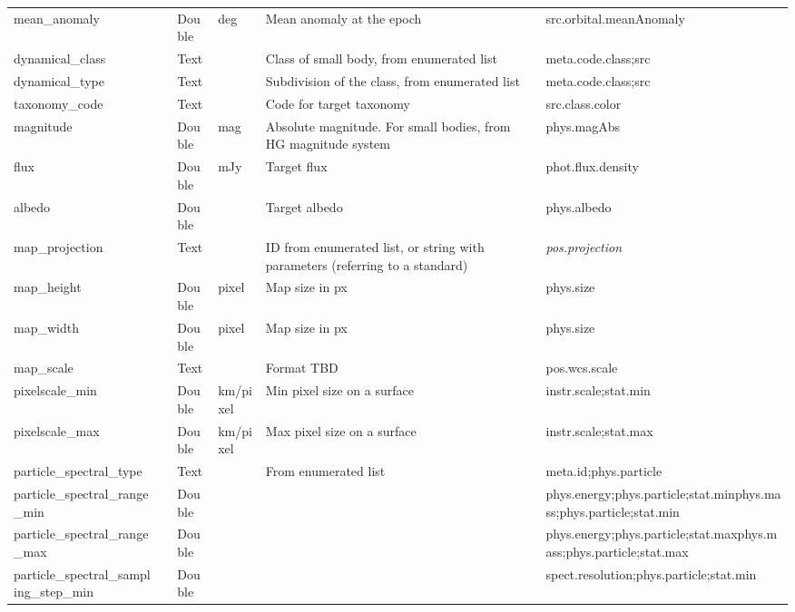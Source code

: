\documentclass[11pt,a4paper]{ivoa}
\begin{document}
\begin{longtable}{p{3.5cm}p{0.5cm}p{1cm}p{1cm}p{7cm}p{3cm}}
mean\_anomaly&&Double&deg&Mean anomaly at the epoch&src.orbital.meanAnomaly\\

dynamical\_class&&Text&&Class of small body, from enumerated list&meta.code.class;src\\

dynamical\_type&&Text&&Subdivision of the class, from enumerated list&meta.code.class;src\\

taxonomy\_code&&Text&&Code for target taxonomy&src.class.color\\

magnitude&&Double&mag&Absolute magnitude. For small bodies, from HG magnitude system&phys.magAbs\\

flux&&Double&mJy&Target flux&phot.flux.density\\

albedo&&Double&&Target albedo&phys.albedo\\

map\_projection&&Text&&ID from enumerated list, or string with parameters (referring to a standard)&\emph{pos.projection}\\

map\_height&&Double&pixel&Map size in px&phys.size\\

map\_width&&Double&pixel&Map size in px&phys.size\\

map\_scale&&Text&&Format TBD&pos.wcs.scale\\

pixelscale\_min&&Double&km/pixel&Min pixel size on a surface&instr.scale;stat.min\\

pixelscale\_max&&Double&km/pixel&Max pixel size on a surface&instr.scale;stat.max\\

particle\_spectral\_type&&Text&&From enumerated list&meta.id;phys.particle\\

particle\_spectral\_range\_min&&Double&&&phys.energy;phys.particle;stat.minphys.mass;phys.particle;stat.min\\

particle\_spectral\_range\_max&&Double&&&phys.energy;phys.particle;stat.maxphys.mass;phys.particle;stat.max\\

particle\_spectral\_sampling\_step\_min&&Double&&&spect.resolution;phys.particle;stat.min \\


\end{longtable}
\end{document}
